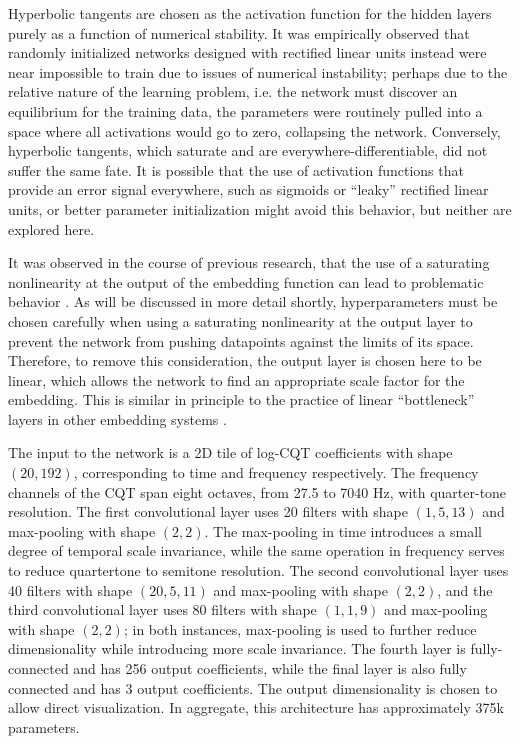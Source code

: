 Hyperbolic tangents are chosen as the activation function for the hidden layers purely as a function of numerical stability.
It was empirically observed that randomly initialized networks designed with rectified linear units instead were near impossible to train due to issues of numerical instability;
perhaps due to the relative nature of the learning problem, i.e. the network must discover an equilibrium for the training data, the parameters were routinely pulled into a space where all activations would go to zero, collapsing the network.
Conversely, hyperbolic tangents, which saturate and are everywhere-differentiable, did not suffer the same fate.
It is possible that the use of activation functions that provide an error signal everywhere, such as sigmoids or ``leaky'' rectified linear units, or better parameter initialization might avoid this behavior, but neither are explored here.

It was observed in the course of previous research, that the use of a saturating nonlinearity at the output of the embedding function can lead to problematic behavior \cite{Humphrey2011Nonlinear}.
As will be discussed in more detail shortly, hyperparameters must be chosen carefully when using a saturating nonlinearity at the output layer to prevent the network from pushing datapoints against the limits of its space.
Therefore, to remove this consideration, the output layer is chosen here to be linear, which allows the network to find an appropriate scale factor for the embedding.
This is similar in principle to the practice of linear ``bottleneck'' layers  in other embedding systems \cite{Yu2011Improved}.

The input to the network is a 2D tile of log-CQT coefficients with shape $(20, 192)$, corresponding to time and frequency respectively.
The frequency channels of the CQT span eight octaves, from 27.5 to 7040 Hz, with quarter-tone resolution.
The first convolutional layer uses 20 filters with shape $(1, 5, 13)$ and max-pooling with shape $(2, 2)$.
The max-pooling in time introduces a small degree of temporal scale invariance, while the same operation in frequency serves to reduce quartertone to semitone resolution.
The second convolutional layer uses 40 filters with shape $(20, 5, 11)$ and max-pooling with shape $(2, 2)$, and the third convolutional layer uses 80 filters with shape $(1, 1, 9)$ and max-pooling with shape $(2, 2)$;
in both instances, max-pooling is used to further reduce dimensionality while introducing more scale invariance.
The fourth layer is fully-connected and has 256 output coefficients, while the final layer is also fully connected and has 3 output coefficients.
The output dimensionality is chosen to allow direct visualization.
In aggregate, this architecture has approximately 375k parameters.



